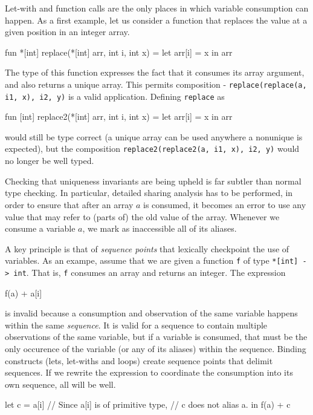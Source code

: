 Let-with and function calls are the only places in which variable
consumption can happen.  As a first example, let us consider a
function that replaces the value at a given position in an integer
array.

\begin{colorcode}
  fun *[int] replace(*[int] arr, int i, int x) =
    let arr[i] = x in arr
\end{colorcode}

The type of this function expresses the fact that it consumes its
array argument, and also returns a unique array.  This permits
composition - \texttt{replace(replace(a, i1, x), i2, y)} is a valid
application.  Defining \texttt{replace} as
\begin{colorcode}
  fun [int] replace2(*[int] arr, int i, int x) =
    let arr[i] = x in arr
\end{colorcode}
would still be type correct (a unique array can be used anywhere a
nonunique is expected), but the composition
\texttt{replace2(replace2(a, i1, x), i2, y)} would no longer be well
typed.

Checking that uniqueness invariants are being upheld is far subtler
than normal type checking.  In particular, detailed sharing analysis
has to be performed, in order to ensure that after an array $a$ is
consumed, it becomes an error to use any value that may refer to
(parts of) the old value of the array.  Whenever we consume a variable
$a$, we mark as inaccessible all of its aliases.


A key principle is that of \textit{sequence points} that lexically
checkpoint the use of variables.  As an exampe, assume that we are
given a function \texttt{f} of type \texttt{*[int]~->~int}.  That is,
\texttt{f} consumes an array and returns an integer.  The expression
\begin{colorcode}
  f(a) + a[i]
\end{colorcode}
is invalid because a consumption and observation of the same variable
happens within the same \textit{sequence}.  It is valid for a sequence
to contain multiple observations of the same variable, but if a
variable is consumed, that must be the only occurence of the variable
(or any of its aliases) within the sequence.  Binding constructs
(lets, let-withs and loops) create sequence points that delimit
sequences.  If we rewrite the expression to coordinate the consumption
into its own sequence, all will be well.
\begin{colorcode}
  let c = a[i] // Since a[i] is of primitive type,
               // c does not alias a.
  in f(a) + c
\end{colorcode}

